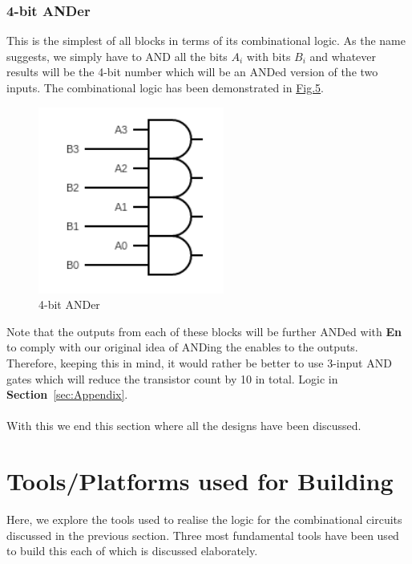\documentclass[a4paper, titlepage]{article}
\begin{document}
\subsubsection{4-bit ANDer}
This is the simplest of all blocks in terms of its combinational logic. As the name suggests, we simply have to AND all
the bits $A_i$ with bits $B_i$ and whatever results will be the 4-bit number which will be an ANDed version of the two inputs.
The combinational logic has been demonstrated in \hyperlink{4A}{Fig.5}.
\begin{figure}[htp]
    \centering
    \hypertarget{4A}{\includegraphics[scale = 1]{Image_4-bit_ANDer.png}}
    \caption{4-bit ANDer}
    \label{fig:fig4}
\end{figure}
Note that the outputs from each of these blocks will be further ANDed with \textbf{En} to comply with 
our original idea of ANDing the enables to the outputs. Therefore, keeping this in mind, it would rather be better 
to use 3-input AND gates which will reduce the transistor count by 10 in total. Logic in \textbf{Section}~\ref{sec:Appendix}.
\\\\
With this we end this section where all the designs have been discussed.

\section{Tools/Platforms used for Building}
Here, we explore the tools used to realise the logic for the combinational circuits discussed in the previous section.
Three most fundamental tools have been used to build this each of which is discussed elaborately.
\end{document}
